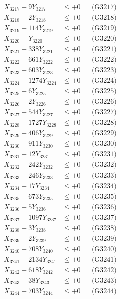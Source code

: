 \documentclass[a4paper,10pt]{article}
\begin{document}
{\begin{align}
X_{3217} - 9Y_{3217} &\leq +0 && \text{(G3217)} \\
X_{3218} - 2Y_{3218} &\leq +0 && \text{(G3218)} \\
X_{3219} - 114Y_{3219} &\leq +0 && \text{(G3219)} \\
X_{3220} - Y_{3220} &\leq +0 && \text{(G3220)} \\
\allowbreak
X_{3221} - 338Y_{3221} &\leq +0 && \text{(G3221)} \\
X_{3222} - 661Y_{3222} &\leq +0 && \text{(G3222)} \\
X_{3223} - 603Y_{3223} &\leq +0 && \text{(G3223)} \\
X_{3224} - 1274Y_{3224} &\leq +0 && \text{(G3224)} \\
X_{3225} - 6Y_{3225} &\leq +0 && \text{(G3225)} \\
X_{3226} - 2Y_{3226} &\leq +0 && \text{(G3226)} \\
X_{3227} - 544Y_{3227} &\leq +0 && \text{(G3227)} \\
X_{3228} - 1727Y_{3228} &\leq +0 && \text{(G3228)} \\
X_{3229} - 406Y_{3229} &\leq +0 && \text{(G3229)} \\
X_{3230} - 911Y_{3230} &\leq +0 && \text{(G3230)} \\
\allowbreak
X_{3231} - 12Y_{3231} &\leq +0 && \text{(G3231)} \\
X_{3232} - 242Y_{3232} &\leq +0 && \text{(G3232)} \\
X_{3233} - 246Y_{3233} &\leq +0 && \text{(G3233)} \\
X_{3234} - 17Y_{3234} &\leq +0 && \text{(G3234)} \\
X_{3235} - 673Y_{3235} &\leq +0 && \text{(G3235)} \\
X_{3236} - 5Y_{3236} &\leq +0 && \text{(G3236)} \\
X_{3237} - 1097Y_{3237} &\leq +0 && \text{(G3237)} \\
X_{3238} - 3Y_{3238} &\leq +0 && \text{(G3238)} \\
X_{3239} - 2Y_{3239} &\leq +0 && \text{(G3239)} \\
X_{3240} - 708Y_{3240} &\leq +0 && \text{(G3240)} \\
\allowbreak
X_{3241} - 2134Y_{3241} &\leq +0 && \text{(G3241)} \\
X_{3242} - 618Y_{3242} &\leq +0 && \text{(G3242)} \\
X_{3243} - 38Y_{3243} &\leq +0 && \text{(G3243)} \\
X_{3244} - 703Y_{3244} &\leq +0 && \text{(G3244)} \\

\end{align}}
\end{document}
